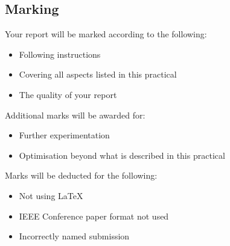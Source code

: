 \subsection{Marking}
Your report will be marked according to the following:
\begin{itemize}
    \item Following instructions
    \item Covering all aspects listed in this practical
    \item The quality of your report
\end{itemize}

Additional marks will be awarded for:
\begin{itemize}
    \item Further experimentation
    \item Optimisation beyond what is described in this practical
\end{itemize}

Marks will be deducted for the following:
\begin{itemize}
    \item Not using \LaTeX
    \item IEEE Conference paper format not used
    \item Incorrectly named submission
\end{itemize}
